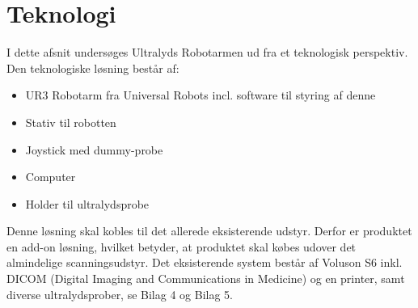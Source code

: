 \chapter{Teknologi} \label{Teknologi}
I dette afsnit undersøges Ultralyds Robotarmen ud fra et teknologisk perspektiv.  \\
Den teknologiske løsning består af:
\begin{itemize}
\item UR3 Robotarm fra Universal Robots incl. software til styring af denne
\item Stativ til robotten
\item Joystick med dummy-probe
\item Computer
\item Holder til ultralydsprobe
\end{itemize}
Denne løsning skal kobles til det allerede eksisterende udstyr. Derfor er produktet en add-on løsning, hvilket betyder, at produktet skal købes udover det almindelige scanningsudstyr. Det eksisterende system består af Voluson S6 inkl. DICOM (Digital Imaging and Communications in Medicine) og en printer, samt diverse ultralydsprober, se Bilag 4 og Bilag 5.  


